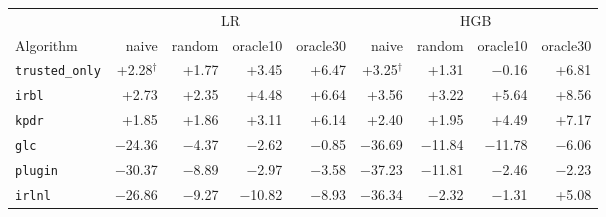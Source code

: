 \begin{tabular}{lrrrrrrrr}
\toprule
 & \multicolumn{4}{c}{LR} & \multicolumn{4}{c}{HGB} \\
\cmidrule(lr){2-5} \cmidrule(lr){6-9}
Algorithm & naive & random & oracle10 & oracle30 & naive & random & oracle10 & oracle30 \\
\midrule
\texttt{trusted\_only} & +2.28$^\dagger$ & +1.77 & +3.45 & +6.47 & +3.25$^\dagger$ & +1.31 & $-$0.16 & +6.81 \\
\texttt{irbl} & +2.73 & +2.35 & +4.48 & +6.64 & +3.56 & +3.22 & +5.64 & +8.56 \\
\texttt{kpdr} & +1.85 & +1.86 & +3.11 & +6.14 & +2.40 & +1.95 & +4.49 & +7.17 \\
\texttt{glc} & $-$24.36 & $-$4.37 & $-$2.62 & $-$0.85 & $-$36.69 & $-$11.84 & $-$11.78 & $-$6.06 \\
\texttt{plugin} & $-$30.37 & $-$8.89 & $-$2.97 & $-$3.58 & $-$37.23 & $-$11.81 & $-$2.46 & $-$2.23 \\
\texttt{irlnl} & $-$26.86 & $-$9.27 & $-$10.82 & $-$8.93 & $-$36.34 & $-$2.32 & $-$1.31 & +5.08 \\
\bottomrule
\end{tabular}
